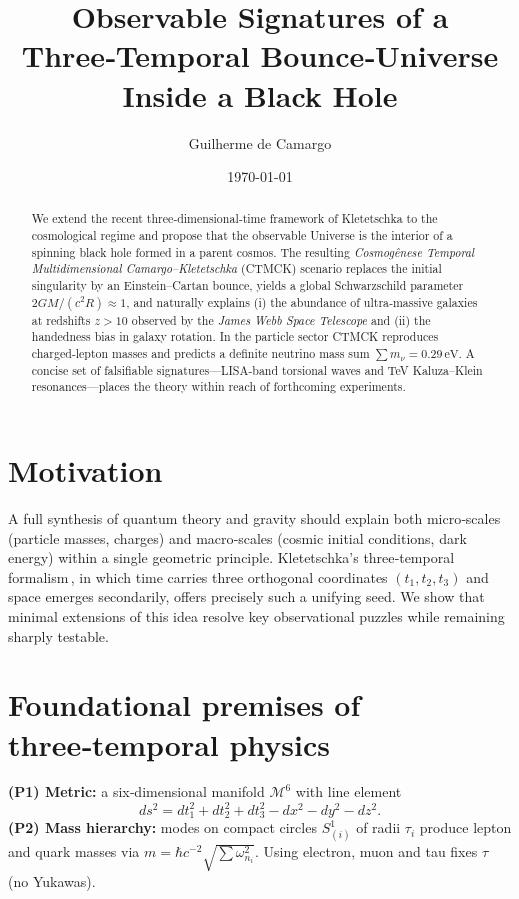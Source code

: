 \documentclass[reprint,amsmath,amssymb,aps,prd,nofootinbib]{revtex4-2}
\begin{document}
\title{Observable Signatures of a Three‑Temporal Bounce‑Universe Inside a Black Hole}

\author{Guilherme de Camargo}

\date{\today}
\begin{abstract}
We extend the recent three‑dimensional‑time framework of Kletetschka to the cosmological regime and propose that the observable Universe is the interior of a spinning black hole formed in a parent cosmos.  The resulting \emph{Cosmogênese Temporal Multidimensional Camargo–Kletetschka} (CTMCK) scenario replaces the initial singularity by an Einstein–Cartan bounce, yields a global Schwarzschild parameter $2GM/(c^{2}R)\approx1$, and naturally explains (i) the abundance of ultra‑massive galaxies at redshifts $z\!>\!10$ observed by the \emph{James Webb Space Telescope} and (ii) the handedness bias in galaxy rotation.  In the particle sector CTMCK reproduces charged‑lepton masses and predicts a definite neutrino mass sum $\sum m_{\nu}=0.29\,\mathrm{eV}$.  A concise set of falsifiable signatures—LISA‑band torsional waves and TeV Kaluza–Klein resonances—places the theory within reach of forthcoming experiments.
\end{abstract}

\maketitle

\section{Motivation}
A full synthesis of quantum theory and gravity should explain both micro‑scales (particle masses, charges) and macro‑scales (cosmic initial conditions, dark energy) within a single geometric principle.  Kletetschka's three‑temporal formalism\,\cite{Kletetschka2025}, in which time carries three orthogonal coordinates $(t_1,t_2,t_3)$ and space emerges secondarily, offers precisely such a unifying seed.  We show that minimal extensions of this idea resolve key observational puzzles while remaining sharply testable.

\section{Foundational premises of three‑temporal physics}
\textbf{(P1) Metric:} a six‑dimensional manifold $\mathcal M^6$ with line element
\begin{equation}\label{eq:metric}
  ds^{2}=dt_{1}^{2}+dt_{2}^{2}+dt_{3}^{2}-dx^{2}-dy^{2}-dz^{2}.
\end{equation}
\textbf{(P2) Mass hierarchy:} modes on compact circles $S_{(i)}^{1}$ of radii $\tau_i$ produce lepton and quark masses via $m=\hbar c^{-2}\sqrt{\sum\omega_{n_i}^{2}}$.  Using electron, muon and tau fixes $\tau$ (no Yukawas).
\end{document}
